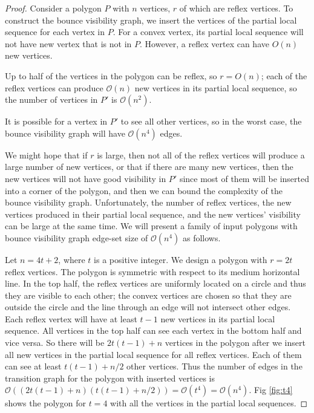 \documentclass[]{styles/svproc}  %
\begin{document}
\begin{proof}
Consider a polygon $P$ with $n$ vertices, $r$ of which are reflex vertices. To
construct the bounce visibility graph, we insert the vertices of the partial
local sequence for each vertex in $P$. For a convex vertex, its partial local sequence will not have new vertex that is not
in $P$. However, a reflex vertex can have $O(n)$ new vertices. 

Up to half of the vertices in the polygon can be reflex, so $r = O(n)$; each 
of the reflex vertices can produce $\mathcal{O}(n)$ new vertices in its partial local 
sequence, so the number of vertices in $P'$ is $\mathcal{O}(n^2)$. 

It is possible for a vertex in $P'$ to see all other vertices, so in the worst
case, the bounce visibility graph will have $\mathcal{O}(n^4)$ edges.

We might hope that if $r$ is large, then not all of the reflex vertices will
produce a large number of new vertices, or that if there are many new vertices,
then the new vertices will not have good visibility in $P'$ since most of them
will be inserted into a corner of the polygon, and then we can bound the
complexity of the bounce visibility graph. Unfortunately, the number of reflex 
vertices, the new
vertices produced in their partial local sequence, and the new vertices'
visibility can be large at the same time. We will present a family of input
polygons with bounce visibility graph edge-set size of $\mathcal{O}(n^4)$ as follows.

Let $n = 4t+2$, where $t$ is a positive integer. We design a polygon with
$r = 2t$ reflex vertices. The polygon is symmetric with respect to its medium
horizontal line. In the top half, the reflex vertices are uniformly located on a
circle and thus they are visible to each other; the convex vertices are chosen
so that they are outside the circle and the line through an edge will not
intersect other edges. Each reflex vertex will have at least $t-1$ new
vertices in its partial local sequence. All vertices in the top half can see
each vertex in the bottom half and vice versa. So there will be $2t(t-1)+n$
vertices in the polygon after we insert all new vertices in the partial local
sequence for all reflex vertices. Each of them can see at least $t(t-1)+n/2$
other vertices. Thus the number of edges in the transition graph for the
polygon with inserted vertices is
$\mathcal{O} ((2t(t-1)+n)(t(t-1)+n/2)) = \mathcal{O}(t^4) = \mathcal{O}(n^4)$.
Fig \ref{fig:t4} shows the polygon for $t = 4$ with all the
vertices in the partial local sequences. %

\end{proof}
\end{document}
